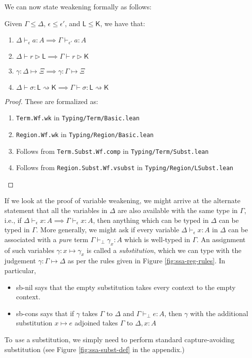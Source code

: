 \documentclass[acmsmall,screen,review]{acmart}
\newcommand{\ms}[1]{\ensuremath{\mathsf{#1}}}
\newcommand{\bhyp}[2]{#1 : #2}
\newcommand{\hasty}[4]{#1 \vdash_{#2} #3: {#4}}
\newcommand{\haslb}[3]{#1 \vdash #2 \rhd #3}
\newcommand{\issubst}[3]{#1: #2 \mapsto #3}
\newcommand{\lbsubst}[4]{#1 \vdash #2: #3 \rightsquigarrow #4}
\newcommand{\brle}[1]{{\textsf{#1}}}
\begin{document}
We can now state weakening formally as follows:
\begin{lemma}[Weakening]
  Given $\Gamma \leq \Delta$, $\epsilon \leq \epsilon'$, and $\ms{L} \leq \ms{K}$, we have that:
  \begin{enumerate}[label=(\alph*)]
    \item $\hasty{\Delta}{\epsilon}{a}{A} \implies \hasty{\Gamma}{\epsilon'}{a}{A}$
    \item $\haslb{\Delta}{r}{\ms{L}} \implies \haslb{\Gamma}{r}{\ms{K}}$
    \item $\issubst{\gamma}{\Delta}{\Xi} \implies \issubst{\gamma}{\Gamma}{\Xi}$
    \item $\lbsubst{\Delta}{\sigma}{\ms{L}}{\ms{K}} \implies \lbsubst{\Gamma}{\sigma}{\ms{L}}{\ms{K}}$
  \end{enumerate}
\end{lemma}
\begin{proof}
  These are formalized as:
  \begin{enumerate}[label=(\alph*)]
    \item \texttt{Term.Wf.wk} in \texttt{Typing/Term/Basic.lean}
    \item \texttt{Region.Wf.wk} in \texttt{Typing/Region/Basic.lean}
    \item Follows from \texttt{Term.Subst.Wf.comp} in \texttt{Typing/Term/Subst.lean}
    \item Follows from \texttt{Region.Subst.Wf.vsubst} in \texttt{Typing/Region/LSubst.lean}
  \end{enumerate}
\end{proof}

If we look at the proof of variable weakening, we might arrive at the alternate statement that all
the variables in $\Delta$ are also available with the same type in $\Gamma$, i.e., if
$\hasty{\Delta}{\epsilon}{x}{A} \implies \hasty{\Gamma}{\epsilon}{x}{A}$, then anything which can be
typed in $\Delta$ can be typed in $\Gamma$. More generally, we might ask if every variable
$\hasty{\Delta}{\epsilon}{x}{A}$ in $\Delta$ can be associated with a \emph{pure} term
$\hasty{\Gamma}{\bot}{\gamma_x}{A}$ which is well-typed in $\Gamma$. An assignment of such variables
$\gamma : x \mapsto \gamma_x$ is called a \emph{substitution}, which we can type with the judgement
$\issubst{\gamma}{\Gamma}{\Delta}$ as per the rules given in Figure \ref{fig:ssa-reg-rules}. In
particular,
\begin{itemize}
  \item \brle{sb-nil} says that the empty substitution takes every context to the empty context.
  \item \brle{sb-cons} says that if $\gamma$ takes $\Gamma$ to $\Delta$ and
  $\hasty{\Gamma}{\bot}{e}{A}$, then $\gamma$ with the additional substitution $x \mapsto e$
  adjoined takes $\Gamma$ to $\Delta, \bhyp{x}{A}$
\end{itemize}
To \emph{use} a substitution, we simply need to perform standard capture-avoiding substitution (see
Figure \ref{fig:ssa-subst-def} in the appendix.)
\end{document}
